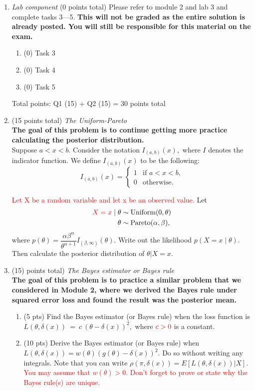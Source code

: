 \documentclass{article}
\begin{document}
\begin{enumerate}
\item {\em Lab component} 
  (0 points total) Please refer to module 2 and lab 3 and complete tasks 3---5. \textbf{This will not be graded as the entire solution is already posted. You will still be responsible for this material on the exam.}
  \begin{enumerate}
  \item (0) Task 3
  \item (0) Task 4
  \item (0) Task 5
  \end{enumerate}
  
  \newpage
  
Total points: Q1 (15) + Q2 (15)  = 30 points total
  
\item (15 points total) {\em The Uniform-Pareto} \\
\textbf{The goal of this problem is to continue getting more practice calculating the posterior distribution.}\\
Suppose $a < x < b.$ Consider the notation
$I_{(a,b)}(x),$ where $I$ denotes the indicator function. We define $I_{(a,b)}(x)$ to be the following:
$$
I_{(a,b)}(x)=
\begin{cases} 
1 & \text{if $a < x < b$,}
\\
0 &\text{otherwise.}
\end{cases}
$$

\textcolor{red}{Let X be a random variable and let x be an observed value.}
Let 
\begin{align*}
\textcolor{red}{X=x} \mid \theta &\sim \text{Uniform}(0,\theta)\\
\theta &\sim \text{Pareto}(\alpha,\beta),
\end{align*}
where $p(\theta) = \dfrac{\alpha \beta^\alpha}{\theta^{\alpha +1}}I_{(\beta,\infty)}(\theta).$
Write out the likelihood $p(X=x\mid \theta).$ Then calculate the posterior distribution of $\theta|X=x.$  
  
  
\item (15)  points total) {\em The Bayes estimator or Bayes rule} \\
\textbf{The goal of this problem is to practice a similar problem that we considered in Module 2, where we derived the Bayes rule under squared error loss and found the result was the posterior mean.}\\
\begin{enumerate}
\item (5 pts) Find the Bayes estimator (or Bayes rule) when the loss function is  $L(\theta, \delta(x))~=~c~(\theta-\delta(x))^2,$ where $\textcolor{red}{c >0}$ is a constant. 
\item (10 pts) Derive the Bayes estimator (or Bayes rule) when $L(\theta, \delta(x)) = w(\theta) (g(\theta)-\delta(x))^2.$ Do so without writing any integrals. Note that you can write $\rho(\pi,\delta(x)) =  E[L(\theta,\delta(x))|X].$  \textcolor{red}{You may assume that $w(\theta) > 0.$} \textcolor{red}{Don't forget to prove or state why the Bayes rule(s) are unique.}
\end{enumerate}


\end{enumerate}
\end{document}

